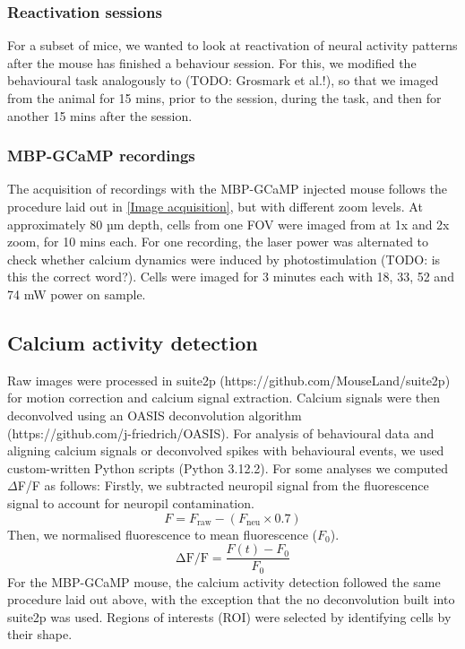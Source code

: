 \subsubsection{Reactivation sessions}
For a subset of mice, we wanted to look at reactivation of neural activity patterns after the mouse has finished a behaviour session.
For this, we modified the behavioural task analogously to (TODO: Grosmark et al.!), so that we imaged from the animal for 15 mins, prior to the session, during the task, and then for another 15 mins after the session.
\subsubsection{MBP-GCaMP recordings}
The acquisition of recordings with the MBP-GCaMP injected mouse follows the procedure laid out in \ref{Image acquisition}, but with different zoom levels.
At approximately 80 µm depth, cells from one FOV were imaged from at 1x and 2x zoom, for 10 mins each.
For one recording, the laser power was alternated to check whether calcium dynamics were induced by photostimulation (TODO: is this the correct word?). Cells were imaged for 3 minutes each with 18, 33, 52 and 74 mW power on sample.
\subsection{Calcium activity detection}
Raw images were processed in suite2p (https://github.com/MouseLand/suite2p) for motion correction and calcium signal extraction. Calcium signals were then deconvolved using an OASIS deconvolution algorithm\\ (https://github.com/j-friedrich/OASIS).
For analysis of behavioural data and aligning calcium signals or deconvolved spikes with behavioural events, we used custom-written Python scripts (Python 3.12.2).
For some analyses we computed \(\Delta \)F/F as follows:
Firstly, we subtracted neuropil signal from the fluorescence signal to account for neuropil contamination.
\begin{equation}
    F = F_{\text{raw}} - (F_{\text{neu}} \times 0.7)
    \label{eq:f}
\end{equation}
Then, we normalised fluorescence to mean fluorescence ($F_0$).
\begin{equation}
    \text{ΔF/F} = \frac{F(t) - F_0}{F_0}
    \label{eq:dFF}
\end{equation}
For the MBP-GCaMP mouse, the calcium activity detection followed the same procedure laid out above, with the exception that the no deconvolution built into suite2p was used. Regions of interests (ROI) were selected by identifying cells by their shape.

